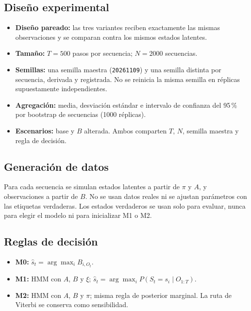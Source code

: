 \documentclass[11pt,a4paper]{article}
\begin{document}
\subsection{Diseño experimental}

\begin{itemize}
  \item \textbf{Diseño pareado:} las tres variantes reciben exactamente las mismas observaciones y se comparan contra los mismos estados latentes.
  \item \textbf{Tamaño:} \(T=500\) pasos por secuencia; \(N=2000\) secuencias.
  \item \textbf{Semillas:} una semilla maestra (\texttt{20261109}) y una semilla distinta por secuencia, derivada y registrada. No se reinicia la misma semilla en réplicas supuestamente independientes.
  \item \textbf{Agregación:} media, desviación estándar e intervalo de confianza del 95\,\% por bootstrap de secuencias (1000 réplicas).
  \item \textbf{Escenarios:} base y \(B\) alterada. Ambos comparten \(T\), \(N\), semilla maestra y regla de decisión.
\end{itemize}

\subsection{Generación de datos}

Para cada secuencia se simulan estados latentes a partir de \(\pi\) y \(A\), y observaciones a partir de \(B\). No se usan datos reales ni se ajustan parámetros con las etiquetas verdaderas. Los estados verdaderos se usan solo para evaluar, nunca para elegir el modelo ni para inicializar M1 o M2.

\subsection{Reglas de decisión}

\begin{itemize}
  \item \textbf{M0:} \(\hat{s}_t=\arg\max_i B_{i,O_t}\).
  \item \textbf{M1:} HMM con \(A\), \(B\) y \(\xi\); \(\hat{s}_t=\arg\max_i P(S_t=s_i\mid O_{1:T})\).
  \item \textbf{M2:} HMM con \(A\), \(B\) y \(\pi\); misma regla de posterior marginal. La ruta de Viterbi se conserva como sensibilidad.
\end{itemize}
\end{document}
